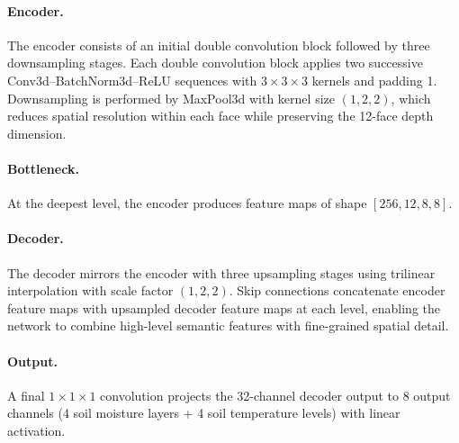 \documentclass[11pt]{article}
\begin{document}
\paragraph{Encoder.} The encoder consists of an initial double convolution block followed by three downsampling stages. Each double convolution block applies two successive Conv3d--BatchNorm3d--ReLU sequences with $3\times3\times3$ kernels and padding 1. Downsampling is performed by MaxPool3d with kernel size $(1, 2, 2)$, which reduces spatial resolution within each face while preserving the 12-face depth dimension.

\paragraph{Bottleneck.} At the deepest level, the encoder produces feature maps of shape $[256, 12, 8, 8]$.

\paragraph{Decoder.} The decoder mirrors the encoder with three upsampling stages using trilinear interpolation with scale factor $(1, 2, 2)$. Skip connections concatenate encoder feature maps with upsampled decoder feature maps at each level, enabling the network to combine high-level semantic features with fine-grained spatial detail.

\paragraph{Output.} A final $1\times1\times1$ convolution projects the 32-channel decoder output to 8 output channels (4 soil moisture layers + 4 soil temperature levels) with linear activation.
\end{document}
